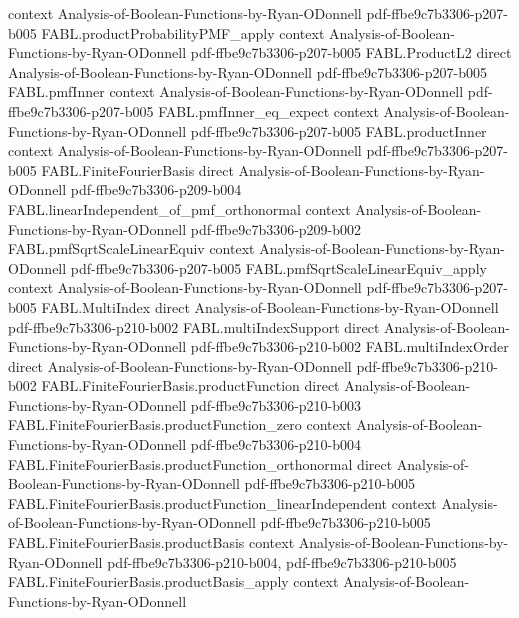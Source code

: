 \begin{theorem}
  {context}
  {Analysis-of-Boolean-Functions-by-Ryan-ODonnell}
  {pdf-ffbe9c7b3306-p207-b005}
\proofstep
  {FABL.productProbabilityPMF_apply}
  {context}
  {Analysis-of-Boolean-Functions-by-Ryan-ODonnell}
  {pdf-ffbe9c7b3306-p207-b005}
\proofstep
  {FABL.ProductL2}
  {direct}
  {Analysis-of-Boolean-Functions-by-Ryan-ODonnell}
  {pdf-ffbe9c7b3306-p207-b005}
\proofstep
  {FABL.pmfInner}
  {context}
  {Analysis-of-Boolean-Functions-by-Ryan-ODonnell}
  {pdf-ffbe9c7b3306-p207-b005}
\proofstep
  {FABL.pmfInner_eq_expect}
  {context}
  {Analysis-of-Boolean-Functions-by-Ryan-ODonnell}
  {pdf-ffbe9c7b3306-p207-b005}
\proofstep
  {FABL.productInner}
  {context}
  {Analysis-of-Boolean-Functions-by-Ryan-ODonnell}
  {pdf-ffbe9c7b3306-p207-b005}
\proofstep
  {FABL.FiniteFourierBasis}
  {direct}
  {Analysis-of-Boolean-Functions-by-Ryan-ODonnell}
  {pdf-ffbe9c7b3306-p209-b004}
\proofstep
  {FABL.linearIndependent_of_pmf_orthonormal}
  {context}
  {Analysis-of-Boolean-Functions-by-Ryan-ODonnell}
  {pdf-ffbe9c7b3306-p209-b002}
\proofstep
  {FABL.pmfSqrtScaleLinearEquiv}
  {context}
  {Analysis-of-Boolean-Functions-by-Ryan-ODonnell}
  {pdf-ffbe9c7b3306-p207-b005}
\proofstep
  {FABL.pmfSqrtScaleLinearEquiv_apply}
  {context}
  {Analysis-of-Boolean-Functions-by-Ryan-ODonnell}
  {pdf-ffbe9c7b3306-p207-b005}
\proofstep
  {FABL.MultiIndex}
  {direct}
  {Analysis-of-Boolean-Functions-by-Ryan-ODonnell}
  {pdf-ffbe9c7b3306-p210-b002}
\proofstep
  {FABL.multiIndexSupport}
  {direct}
  {Analysis-of-Boolean-Functions-by-Ryan-ODonnell}
  {pdf-ffbe9c7b3306-p210-b002}
\proofstep
  {FABL.multiIndexOrder}
  {direct}
  {Analysis-of-Boolean-Functions-by-Ryan-ODonnell}
  {pdf-ffbe9c7b3306-p210-b002}
\proofstep
  {FABL.FiniteFourierBasis.productFunction}
  {direct}
  {Analysis-of-Boolean-Functions-by-Ryan-ODonnell}
  {pdf-ffbe9c7b3306-p210-b003}
\proofstep
  {FABL.FiniteFourierBasis.productFunction_zero}
  {context}
  {Analysis-of-Boolean-Functions-by-Ryan-ODonnell}
  {pdf-ffbe9c7b3306-p210-b004}
\proofstep
  {FABL.FiniteFourierBasis.productFunction_orthonormal}
  {direct}
  {Analysis-of-Boolean-Functions-by-Ryan-ODonnell}
  {pdf-ffbe9c7b3306-p210-b005}
\proofstep
  {FABL.FiniteFourierBasis.productFunction_linearIndependent}
  {context}
  {Analysis-of-Boolean-Functions-by-Ryan-ODonnell}
  {pdf-ffbe9c7b3306-p210-b005}
\proofstep
  {FABL.FiniteFourierBasis.productBasis}
  {context}
  {Analysis-of-Boolean-Functions-by-Ryan-ODonnell}
  {pdf-ffbe9c7b3306-p210-b004,
    pdf-ffbe9c7b3306-p210-b005}
\proofstep
  {FABL.FiniteFourierBasis.productBasis_apply}
  {context}
  {Analysis-of-Boolean-Functions-by-Ryan-ODonnell}

\end{theorem}
